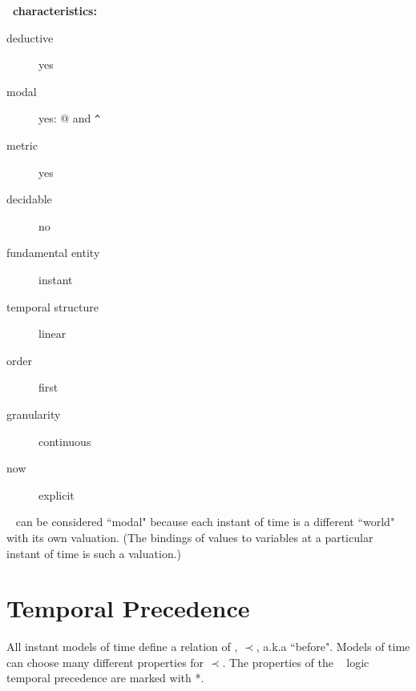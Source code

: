 \textbf{\logicid ~characteristics:}
\begin{description}
\item[deductive] yes
\item[modal] yes: @ and \lstinline{^}
\item[metric] yes 
\item[decidable] no 
\item[fundamental entity] instant
\item[temporal structure] linear
\item[order] first
\item[granularity] continuous
\item[now] explicit
\end{description}

\pn \logicid~ can be considered ``modal" because each instant of time is a different ``world" with its own valuation.  (The bindings of values to variables at a particular instant of time is such a valuation.)

\section{Temporal Precedence}\label{sec:precedence}

\pn All instant models of time define a relation of , $\prec$, a.k.a ``before".
Models of time can choose many different properties for $\prec$.  The properties of the \lang~ logic temporal precedence are marked with *.

